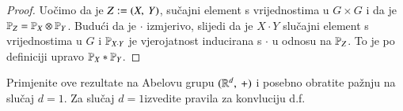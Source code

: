 \begin{proof}
    Uo\v cimo da je $Z:= ({X}, \: {Y})$, su\v cajni element s vrijednostima u $G \times G$ i da je $\mathbb{P}_Z = \mathbb{P}_X \otimes \mathbb{P}_Y$.
    Budu\' ci da je $\cdot$ izmjerivo, slijedi da je $X \cdot Y$ slu\v cajni element s vrijednostima u $G$ i $\mathbb{P}_{X \cdot Y}$ je vjerojatnost inducirana s $\cdot$ u odnosu na $\mathbb{P}_Z$.
    To je po definiciji upravo
    $\mathbb{P}_X * \mathbb{P}_Y$.
\end{proof}

\begin{zad} \label{zad:7.16}
    Primjenite ove rezultate na Abelovu grupu $({\mathbb{R}^d}, \: {+})$ i posebno obratite pa\v znju na slu\v caj $d = 1$.
    Za slu\v caj $d = 1$izvedite pravila za konvluciju d.f.
\end{zad}

